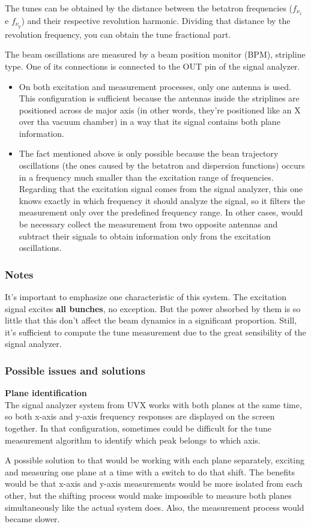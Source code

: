 The tunes can be obtained by the distance between the betatron frequencies ($f_{\nu_x}$ e $f_{\nu_y}$) and their respective revolution harmonic. Dividing that distance by the revolution frequency, you can obtain the tune fractional part.

The beam oscillations are measured by a beam position monitor (BPM), stripline type. One of its connections is connected to the OUT pin of the signal analyzer.

\begin{itemize}
	\item On both excitation and measurement processes, only one antenna is used. This configuration is sufficient because the antennas inside the striplines are positioned across de major axis (in other words, they're positioned like an X over tha vacuum chamber) in a way that its signal contains both plane information.
	\item The fact mentioned above is only possible because the bean trajectory oscillations (the ones caused by the betatron and dispersion functions) occurs in a frequency much smaller than the excitation range of frequencies. Regarding that the excitation signal comes from the signal analyzer, this one knows exactly in which frequency it should analyze the signal, so it filters the measurement only over the predefined frequency range. In other cases, would be necessary collect the measurement from two opposite antennas and subtract their signals to obtain information only from the excitation oscillations.
\end{itemize}

\subsubsection{Notes}
It's important to emphasize one characteristic of this system. The excitation signal excites \textbf{all bunches}, no exception. But the power absorbed by them is so little that this don't affect the beam dynamics in a significant proportion. Still, it's sufficient to compute the tune measurement due to the great sensibility of the signal analyzer.

\subsubsection{Possible issues and solutions}
\noindent
\textbf{Plane identification}\\

The signal analyzer system from UVX works with both planes at the same time, so both x-axis and y-axis frequency responses are displayed on the screen together. In that configuration, sometimes could be difficult for the tune measurement algorithm to identify which peak belongs to which axis.

A possible solution to that would be working with each plane separately, exciting and measuring one plane at a time with a switch to do that shift. The benefits would be that x-axis and y-axis measurements would be more isolated from each other, but the shifting process would make impossible to measure both planes simultaneously like the actual system does. Also, the measurement process would became slower.

\pagebreak